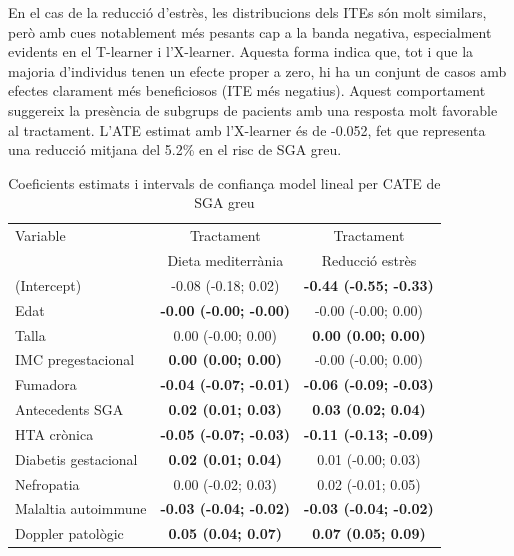 \documentclass[../main.tex]{subfiles}
\begin{document}
    En el cas de la reducció d'estrès, les distribucions dels ITEs són molt similars, però amb cues notablement més pesants cap a la banda negativa, especialment evidents en el T-learner i l’X-learner. Aquesta forma indica que, tot i que la majoria d’individus tenen un efecte proper a zero, hi ha un conjunt de casos amb efectes clarament més beneficiosos (ITE més negatius). Aquest comportament suggereix la presència de subgrups de pacients amb una resposta molt favorable al tractament. L’ATE estimat amb l’X-learner és de -0.052, fet que representa una reducció mitjana del 5.2\% en el risc de SGA greu.


    \begin{table}[H]
        \centering
        \captionsetup{font=small}
        \caption{Coeficients estimats i intervals de confiança model lineal per CATE de SGA greu}
        \label{tab:coef_SGAgreu}
        \centering
        \scriptsize
        \begin{tabular}[t]{p{4cm} c @{\hspace{1cm}} c}
        \toprule
        Variable & Tractament  & Tractament \\
         & Dieta mediterrània & Reducció estrès \\
        \midrule
        (Intercept) & -0.08 (-0.18; 0.02) & \textbf{-0.44 (-0.55; -0.33)}\\
        Edat & \textbf{-0.00 (-0.00; -0.00)} & -0.00 (-0.00; 0.00)\\
        Talla & 0.00 (-0.00; 0.00) & \textbf{0.00 (0.00; 0.00)}\\
        IMC pregestacional & \textbf{0.00 (0.00; 0.00)} & -0.00 (-0.00; 0.00)\\
        Fumadora & \textbf{-0.04 (-0.07; -0.01)} & \textbf{-0.06 (-0.09; -0.03)}\\
        \addlinespace
        Antecedents SGA & \textbf{0.02 (0.01; 0.03)} & \textbf{0.03 (0.02; 0.04)}\\
        HTA crònica & \textbf{-0.05 (-0.07; -0.03)} & \textbf{-0.11 (-0.13; -0.09)}\\
        Diabetis gestacional & \textbf{0.02 (0.01; 0.04)} & 0.01 (-0.00; 0.03)\\
        Nefropatia & 0.00 (-0.02; 0.03) & 0.02 (-0.01; 0.05)\\
        Malaltia autoimmune & \textbf{-0.03 (-0.04; -0.02)} & \textbf{-0.03 (-0.04; -0.02)}\\
        \addlinespace
        Doppler patològic & \textbf{0.05 (0.04; 0.07)} & \textbf{0.07 (0.05; 0.09)}\\

\end{tabular}
\end{table}
\end{document}
